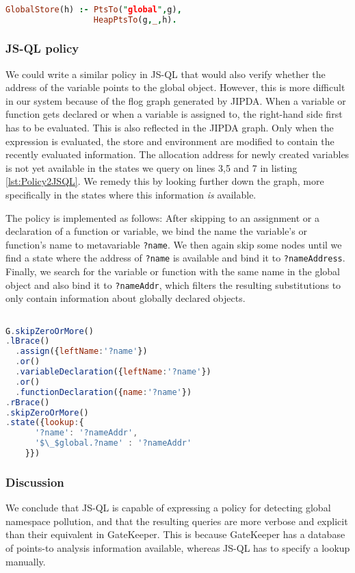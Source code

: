 \begin{lstlisting}[label={lst:Policy2GK},language=Prolog,caption=Policy 2 in GateKeeper,mathescape=true]  % float=t?

GlobalStore(h) :- PtsTo("global",g),
                  HeapPtsTo(g,_,h).
\end{lstlisting}


\subsubsection*{JS-QL policy}
We could write a similar policy in JS-QL that would also verify whether the address of the variable points to the global object. However, this is more difficult in our system because of the flog graph generated by JIPDA. When a variable or function gets declared or when a variable is assigned to, the right-hand side first has to be evaluated. This is also reflected in the JIPDA graph. Only when the expression is evaluated, the store and environment are modified to contain the recently evaluated information. The allocation address for newly created variables is not yet available in the states we query on lines 3,5 and 7 in listing \ref{lst:Policy2JSQL}. We remedy this by looking further down the graph, more specifically in the states where this information \textit{is} available. 

The policy is implemented as follows: After skipping to an assignment or a declaration of a function or variable, we bind the name the variable's or function's name to metavariable \texttt{?name}. We then again skip some nodes until we find a state where the address of \texttt{?name} is available and bind it to \texttt{?nameAddress}. Finally, we search for the variable or function with the same name in the global object and also bind it to \texttt{?nameAddr}, which filters the resulting substitutions to only contain information about globally declared objects.

\begin{lstlisting}[label={lst:Policy2JSQL},language=JavaScript,caption=Policy 2 in JS-QL,mathescape=true]  % float=t?

G.skipZeroOrMore()
.lBrace()
  .assign({leftName:'?name'})
  .or()
  .variableDeclaration({leftName:'?name'})
  .or()
  .functionDeclaration({name:'?name'})
.rBrace()
.skipZeroOrMore()
.state({lookup:{
      '?name': '?nameAddr',
      '$\_$global.?name' : '?nameAddr'
    }})
\end{lstlisting}

\subsubsection{Discussion}
We conclude that JS-QL is capable of expressing a policy for detecting global namespace pollution, and that the resulting queries are more verbose and explicit than their equivalent in GateKeeper. This is because GateKeeper has a database of points-to analysis information available, whereas JS-QL has to specify a lookup manually.

